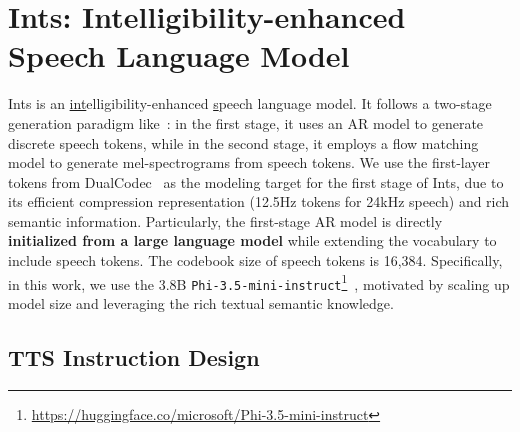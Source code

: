 \documentclass[11pt]{article}
\begin{document}
\section{Ints: Intelligibility-enhanced Speech Language Model}\label{sec:appendix-detail-ins}

Ints is an \underline{int}elligibility-enhanced \underline{s}peech language model. 
It follows a two-stage generation paradigm like~\cite{seedtts, cosyvoice, maskgct}: in the first stage, it uses an AR model to generate discrete speech tokens, while in the second stage, it employs a flow matching model to generate mel-spectrograms from speech tokens. We use the first-layer tokens from DualCodec~\cite{dualcodec} as the modeling target for the first stage of Ints, due to its efficient compression representation (12.5Hz tokens for 24kHz speech) and rich semantic information. Particularly, the first-stage AR model is directly \textbf{initialized from a large language model} while extending the vocabulary to include speech tokens. The codebook size of speech tokens is 16,384. Specifically, in this work, we use the 3.8B \texttt{Phi-3.5-mini-instruct}\footnote{\href{https://huggingface.co/microsoft/Phi-3.5-mini-instruct}{https://huggingface.co/microsoft/Phi-3.5-mini-instruct}}~\cite{phi3}, motivated by scaling up model size and leveraging the rich textual semantic knowledge.

\subsection{TTS Instruction Design}
\end{document}
